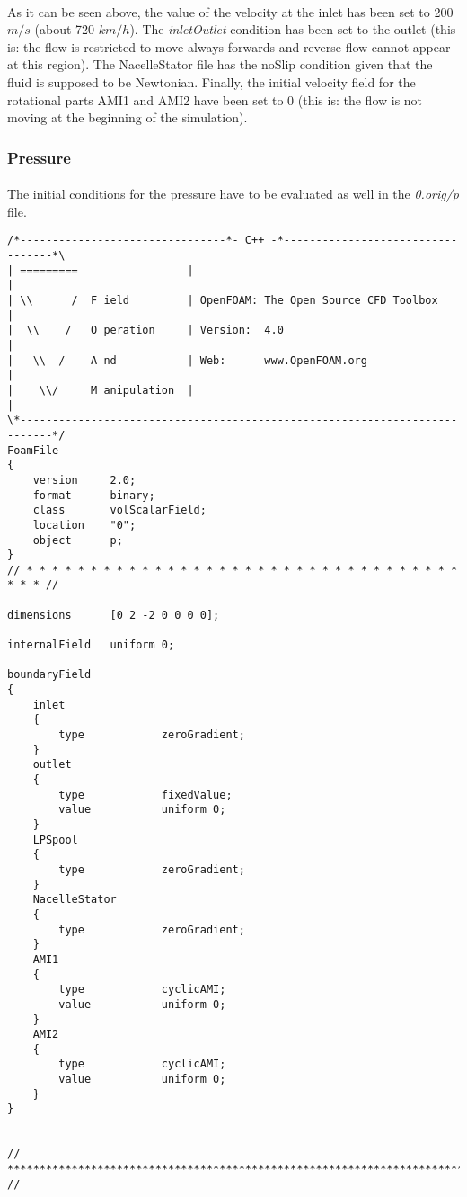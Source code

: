 \paragraph{}As it can be seen above, the value of the velocity at the inlet has been set to 200 $m/s$ (about 720 $km/h$). The \textit{inletOutlet} condition has been set to the outlet (this is: the flow is restricted to move always forwards and reverse flow cannot appear at this region). The NacelleStator file has the noSlip condition given that the fluid is supposed to be Newtonian. Finally, the initial velocity field for the rotational parts AMI1 and AMI2 have been set to 0 (this is: the flow is not moving at the beginning of the simulation).

\subsubsection{Pressure}

\paragraph{}The initial conditions for the pressure have to be evaluated as well in the \textit{0.orig/p} file.

\begin{footnotesize}
\begin{verbatim}
/*--------------------------------*- C++ -*----------------------------------*\
| =========                 |                                                 |
| \\      /  F ield         | OpenFOAM: The Open Source CFD Toolbox           |
|  \\    /   O peration     | Version:  4.0                                   |
|   \\  /    A nd           | Web:      www.OpenFOAM.org                      |
|    \\/     M anipulation  |                                                 |
\*---------------------------------------------------------------------------*/
FoamFile
{
    version     2.0;
    format      binary;
    class       volScalarField;
    location    "0";
    object      p;
}
// * * * * * * * * * * * * * * * * * * * * * * * * * * * * * * * * * * * * * //

dimensions      [0 2 -2 0 0 0 0];

internalField   uniform 0;

boundaryField
{
    inlet
    {
        type            zeroGradient;
    }
    outlet
    {
        type            fixedValue;
        value           uniform 0;
    }
    LPSpool
    {
        type            zeroGradient;
    }
    NacelleStator
    {
        type            zeroGradient;
    }
    AMI1
    {
        type            cyclicAMI;
        value           uniform 0;
    }
    AMI2
    {
        type            cyclicAMI;
        value           uniform 0;
    }
}


// ************************************************************************* //
\end{verbatim}
\end{footnotesize}

